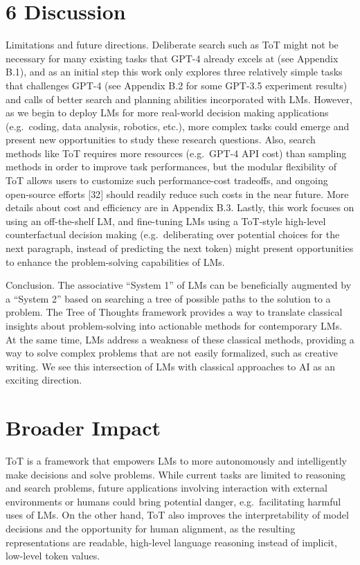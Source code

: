 \documentclass[
]{article}
\begin{document}
\section{6 Discussion}\label{discussion}

Limitations and future directions. Deliberate search such as ToT might
not be necessary for many existing tasks that GPT-4 already excels at
(see Appendix B.1), and as an initial step this work only explores three
relatively simple tasks that challenges GPT-4 (see Appendix B.2 for some
GPT-3.5 experiment results) and calls of better search and planning
abilities incorporated with LMs. However, as we begin to deploy LMs for
more real-world decision making applications (e.g.~coding, data
analysis, robotics, etc.), more complex tasks could emerge and present
new opportunities to study these research questions. Also, search
methods like ToT requires more resources (e.g.~GPT-4 API cost) than
sampling methods in order to improve task performances, but the modular
flexibility of ToT allows users to customize such performance-cost
tradeoffs, and ongoing open-source efforts {[}32{]} should readily
reduce such costs in the near future. More details about cost and
efficiency are in Appendix B.3. Lastly, this work focuses on using an
off-the-shelf LM, and fine-tuning LMs using a ToT-style high-level
counterfactual decision making (e.g.~deliberating over potential choices
for the next paragraph, instead of predicting the next token) might
present opportunities to enhance the problem-solving capabilities of
LMs.

Conclusion. The associative ``System 1'' of LMs can be beneficially
augmented by a ``System 2'' based on searching a tree of possible paths
to the solution to a problem. The Tree of Thoughts framework provides a
way to translate classical insights about problem-solving into
actionable methods for contemporary LMs. At the same time, LMs address a
weakness of these classical methods, providing a way to solve complex
problems that are not easily formalized, such as creative writing. We
see this intersection of LMs with classical approaches to AI as an
exciting direction.

\section{Broader Impact}\label{broader-impact}

ToT is a framework that empowers LMs to more autonomously and
intelligently make decisions and solve problems. While current tasks are
limited to reasoning and search problems, future applications involving
interaction with external environments or humans could bring potential
danger, e.g.~facilitating harmful uses of LMs. On the other hand, ToT
also improves the interpretability of model decisions and the
opportunity for human alignment, as the resulting representations are
readable, high-level language reasoning instead of implicit, low-level
token values.
\end{document}
